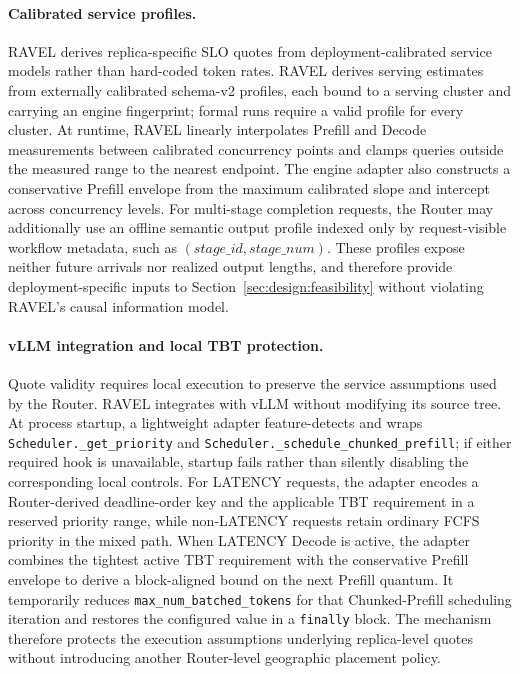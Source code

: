 \documentclass[letterpaper,twocolumn,10pt]{article}
\begin{document}
\paragraph{Calibrated service profiles.}
RAVEL derives replica-specific SLO quotes from deployment-calibrated service
models rather than hard-coded token rates.
RAVEL derives serving estimates from externally calibrated schema-v2 profiles,
each bound to a serving cluster and carrying an engine fingerprint; formal runs
require a valid profile for every cluster.
At runtime, RAVEL linearly interpolates Prefill and Decode measurements between
calibrated concurrency points and clamps queries outside the measured range to
the nearest endpoint.
The engine adapter also constructs a conservative Prefill envelope from the
maximum calibrated slope and intercept across concurrency levels.
For multi-stage completion requests, the Router may additionally use an offline
semantic output profile indexed only by request-visible workflow metadata, such
as $(\textit{stage\_id},\textit{stage\_num})$.
These profiles expose neither future arrivals nor realized output lengths, and
therefore provide deployment-specific inputs to
Section~\ref{sec:design:feasibility} without violating RAVEL's causal
information model.

\paragraph{vLLM integration and local TBT protection.}
Quote validity requires local execution to preserve the service assumptions
used by the Router.
RAVEL integrates with vLLM without modifying its source tree.
At process startup, a lightweight adapter feature-detects and wraps
\texttt{Scheduler.\_get\_priority} and
\texttt{Scheduler.\_schedule\_chunked\_prefill}; if either required hook is
unavailable, startup fails rather than silently disabling the corresponding
local controls.
For LATENCY requests, the adapter encodes a Router-derived deadline-order key
and the applicable TBT requirement in a reserved priority range, while
non-LATENCY requests retain ordinary FCFS priority in the mixed path.
When LATENCY Decode is active, the adapter combines the tightest active TBT
requirement with the conservative Prefill envelope to derive a block-aligned
bound on the next Prefill quantum.
It temporarily reduces \texttt{max\_num\_batched\_tokens} for that
Chunked-Prefill scheduling iteration and restores the configured value in a
\texttt{finally} block.
The mechanism therefore protects the execution assumptions underlying
replica-level quotes without introducing another Router-level geographic
placement policy.
\end{document}
